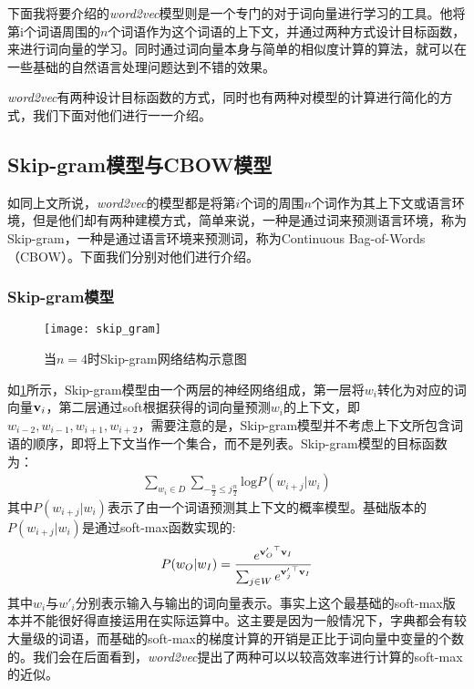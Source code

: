 下面我将要介绍的\emph{word2vec}模型则是一个专门的对于词向量进行学习的工具。他将第i个词语周围的$n$个词语作为这个词语的上下文，并通过两种方式设计目标函数，来进行词向量的学习。同时通过词向量本身与简单的相似度计算的算法，就可以在一些基础的自然语言处理问题达到不错的效果。

\emph{word2vec}有两种设计目标函数的方式，同时也有两种对模型的计算进行简化的方式，我们下面对他们进行一一介绍。

\subsection{Skip-gram模型与CBOW模型}

如同上文所说，\emph{word2vec}的模型都是将第$i$个词的周围$n$个词作为其上下文或语言环境，但是他们却有两种建模方式，简单来说，一种是通过词来预测语言环境，称为Skip-gram，一种是通过语言环境来预测词，称为Continuous Bag-of-Words（CBOW）。下面我们分别对他们进行介绍。

\subsubsection{Skip-gram模型}

\begin{figure}
\centering
\texttt{[image: skip\_gram]}
\caption{当$n=4$时Skip-gram网络结构示意图}
\label{fig:skip_gram}
\end{figure}

如\ref{fig:skip_gram}所示，Skip-gram模型由一个两层的神经网络组成，第一层将$w_i$转化为对应的词向量${{\mathbf v}}_i$，第二层通过soft根据获得的词向量预测$w_i$的上下文，即$w_{i-2}, w_{i-1}, w_{i+1}, w_{i+2}$，需要注意的是，Skip-gram模型并不考虑上下文所包含词语的顺序，即将上下文当作一个集合，而不是列表。Skip-gram模型的目标函数为：
\begin{eqnarray*}
\sum_{w_i \in D} \sum_{-\frac{n}{2}\leq j \frac{n}{2}} \mathrm{log}P(w_{i+j} | w_i)
\end{eqnarray*}
其中$P(w_{i+j} | w_i)$表示了由一个词语预测其上下文的概率模型。基础版本的$P(w_{i+j} | w_i)$是通过soft-max函数实现的: 
\begin{equation}
\label{eq:soft_max}
P(w_O | w_I) = \frac{e^{{{{\mathbf v}}'_O}^\top {{\mathbf v}}_I}}{\sum_{j \in W} e^{{{{\mathbf v}}'_j}^\top {{\mathbf v}}_I}}
\end{equation}
其中$w_i$与$w'_i$分别表示输入与输出的词向量表示。事实上这个最基础的soft-max版本并不能很好得直接运用在实际运算中。这主要是因为一般情况下，字典都会有较大量级的词语，而基础的soft-max的梯度计算的开销是正比于词向量中变量的个数的。我们会在后面看到，\emph{word2vec}提出了两种可以以较高效率进行计算的soft-max的近似。

